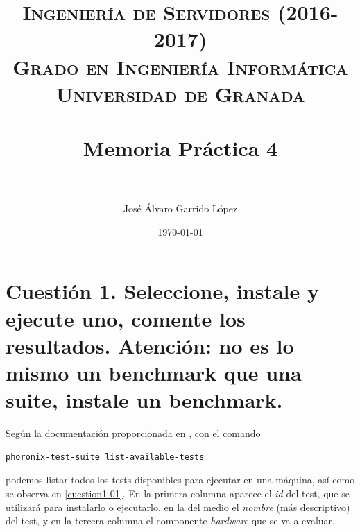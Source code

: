 


\title{	
\normalfont \normalsize 
\textsc{\textbf{Ingeniería de Servidores (2016-2017)} \\ Grado en Ingeniería Informática \\ Universidad de Granada} \\ [25pt] %
\horrule{0.5pt} \\[0.4cm] %
\huge Memoria Práctica 4 \\ %
\horrule{2pt} \\[0.5cm] %
}

\author{José Álvaro Garrido López} %

\date{\normalsize\today} %



\maketitle %

\newpage %

\tableofcontents %

\listoffigures

\newpage

\newpage

\section{Cuestión 1. Seleccione, instale y ejecute uno, comente los resultados. \textbf{Atención:} no es lo mismo un benchmark que una suite, instale un benchmark.}

Según la documentación proporcionada en \cite{phoronix}, con el comando
\begin{verbatim}
phoronix-test-suite list-available-tests
\end{verbatim}
podemos listar todos los tests disponibles para ejecutar en una máquina, así como se observa en \ref{cuestion1-01}.
En la primera columna aparece el \textit{id} del test, que se utilizará para instalarlo o ejecutarlo, en la del medio el \textit{nombre} (más descriptivo) del test, y en la tercera columna el componente \textit{hardware} que se va a evaluar.

